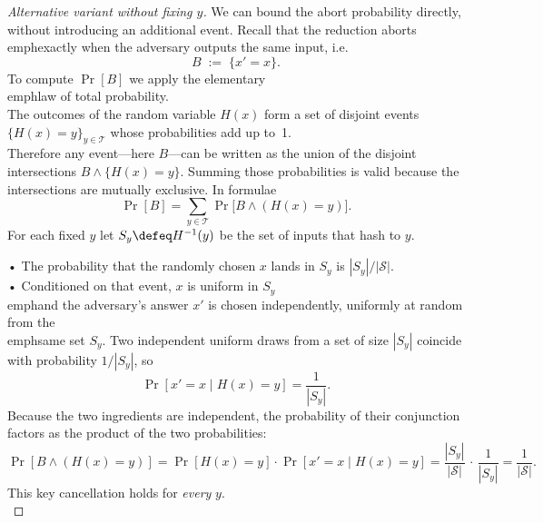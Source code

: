 
\begin{proof}[Alternative variant without fixing $y$]
We can bound the abort probability directly, without introducing an additional event.  Recall that the reduction aborts \\emph{exactly} when the adversary outputs the same input, i.e.
\[
  B \;:=\; \{x' = x\}.
\]
To compute $\Pr[B]$ we apply the elementary \\emph{law of total probability}.  \\
The outcomes of the random variable $H(x)$ form a set of disjoint events $\{H(x)=y\}_{y\in\mathcal T}$ whose probabilities add up to~1.  \\
Therefore any event—here $B$—can be written as the union of the disjoint intersections $B \wedge \{H(x)=y\}$.  Summing those probabilities is valid because the intersections are mutually exclusive.  In formulae
\[
  \Pr[B] = \sum_{y\in\mathcal T} \Pr\bigl[ B \wedge (H(x)=y) \bigr].
\]
For each fixed $y$ let $S_y \defeq H^{-1}(y)$ be the set of inputs that hash to $y$.

•  The probability that the randomly chosen $x$ lands in $S_y$ is $|S_y|/|\mathcal S|$.  \\
•  Conditioned on that event, $x$ is uniform in $S_y$ \\emph{and} the adversary's answer $x'$ is chosen independently, uniformly at random from the \\emph{same} set $S_y$.  Two independent uniform draws from a set of size $|S_y|$ coincide with probability $1/|S_y|$, so
\[
  \Pr[x'=x\mid H(x)=y] = \frac{1}{|S_y|}.
\]
Because the two ingredients are independent, the probability of their conjunction factors as the product of the two probabilities:
\[
  \Pr[B \wedge (H(x)=y)] = \Pr[H(x)=y] \cdot \Pr[x'=x \mid H(x)=y] = \frac{|S_y|}{|\mathcal S|}\,\cdot\,\frac{1}{|S_y|}=\frac{1}{|\mathcal S|}.
\]
This key cancellation holds for \emph{every} $y$. \\
\end{proof}
